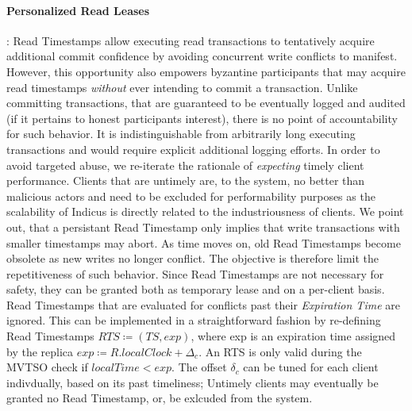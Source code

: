 \fi



\paragraph{Personalized Read Leases}: 
Read Timestamps allow executing read transactions to tentatively acquire additional commit confidence by avoiding concurrent write conflicts to manifest. However, this opportunity also empowers byzantine participants that may acquire read timestamps \textit{without} ever intending to commit a transaction. Unlike committing transactions, that are guaranteed to be eventually logged and audited (if it pertains to honest participants interest), there is no point of accountability for such behavior. It is indistinguishable from arbitrarily long executing transactions and would require explicit additional logging efforts. In order to avoid targeted abuse, we re-iterate the rationale of \textit{expecting} timely client performance. Clients that are untimely are, to the system, no better than malicious actors and need to be excluded for performability purposes as the scalability of Indicus is directly related to the industriousness of clients. 
We point out, that a persistant Read Timestamp only implies that write transactions with smaller timestamps may abort. As time moves on, old Read Timestamps become obsolete as new writes no longer conflict. The objective is therefore limit the repetitiveness of such behavior.
Since Read Timestamps are not necessary for safety, they can be granted both as temporary lease and on a per-client basis. Read Timestamps that are evaluated for conflicts past their \textit{Expiration Time} are ignored. This can be implemented in a straightforward fashion by re-defining Read Timestamps $RTS \coloneqq (TS, exp )$, where exp is an expiration time assigned by the replica $exp \coloneqq R.localClock + \Delta_c$. An RTS is only valid during the MVTSO check if $localTime < exp$. The offset $\delta_c$ can be tuned for each client indivdually, based on its past timeliness; Untimely clients may eventually be granted no Read Timestamp, or, be exlcuded from the system.



